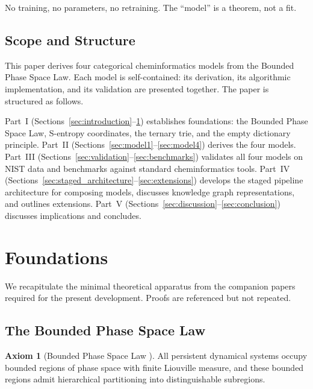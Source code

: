 \documentclass[11pt,twocolumn,a4paper]{article}
\theoremstyle{definition}
\newtheorem{axiom}{Axiom}
\theoremstyle{remark}
\begin{document}
No training, no parameters, no retraining. The ``model'' is a theorem, not a fit.

\subsection{Scope and Structure}

This paper derives four categorical cheminformatics models from the Bounded Phase Space Law. Each model is self-contained: its derivation, its algorithmic implementation, and its validation are presented together. The paper is structured as follows.

Part~I (Sections~\ref{sec:introduction}--\ref{sec:foundations}) establishes foundations: the Bounded Phase Space Law, S-entropy coordinates, the ternary trie, and the empty dictionary principle. Part~II (Sections~\ref{sec:model1}--\ref{sec:model4}) derives the four models. Part~III (Sections~\ref{sec:validation}--\ref{sec:benchmarks}) validates all four models on NIST data and benchmarks against standard cheminformatics tools. Part~IV (Sections~\ref{sec:staged_architecture}--\ref{sec:extensions}) develops the staged pipeline architecture for composing models, discusses knowledge graph representations, and outlines extensions. Part~V (Sections~\ref{sec:discussion}--\ref{sec:conclusion}) discusses implications and concludes.

\section{Foundations}
\label{sec:foundations}

We recapitulate the minimal theoretical apparatus from the companion papers \citep{sachikonye2025a, sachikonye2025b, sachikonye2025c} required for the present development. Proofs are referenced but not repeated.

\subsection{The Bounded Phase Space Law}

\begin{axiom}[Bounded Phase Space Law {\citep[Axiom~1]{sachikonye2025a}}]
\label{ax:bpsl}
All persistent dynamical systems occupy bounded regions of phase space with finite Liouville measure, and these bounded regions admit hierarchical partitioning into distinguishable subregions.
\end{axiom}
\end{document}
